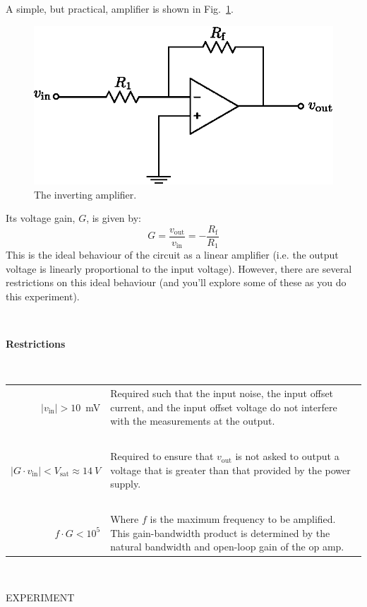 \documentclass[12pt,oneside,openany,letterpaper]{article}
\begin{document}
\noindent A simple, but practical, amplifier is shown in Fig.~\ref{fig:2}.
\begin{figure}[h!]
\begin{center}
\includegraphics[width=9.5 cm]{inverting.eps}
\caption{\label{fig:2}The inverting amplifier.}
\end{center}
\end{figure}
Its voltage gain, $G$, is given by:
\begin{equation}
G=\frac{v_\mathrm{out}}{v_\mathrm{in}}=-\frac{R_\mathrm{f}}{R_1}
\end{equation}
This is the ideal behaviour of the circuit as a linear amplifier (i.e. the output voltage is linearly proportional to the input voltage). However, there are several restrictions on this ideal behaviour (and you'll explore some of these as you do this experiment).

~

{\bf Restrictions}

~

\begin{tabular}{rp{12.5 cm}}
$\vert v_\mathrm{in}\vert > 10$~mV & Required such that the input noise, the input offset current, and the input offset voltage do not interfere with the measurements at the output.\\
~ & ~\\
$\vert G\cdot v_\mathrm{in}\vert<V_\mathrm{sat}\approx 14~V$ & Required to ensure that $v_\mathrm{out}$ is not asked to output a voltage that is greater than that provided by the power supply.\\
~ & ~\\
$f\cdot G<10^5$ & Where $f$ is the maximum frequency to be amplified.  This gain-bandwidth product is determined by the natural bandwidth and open-loop gain of the op amp.
\end{tabular}

~

\noindent EXPERIMENT

~
\end{document}
